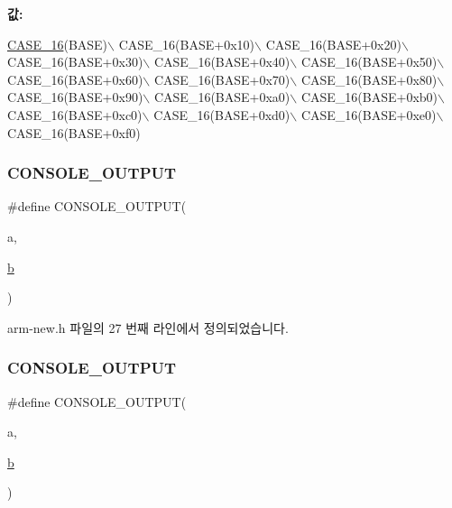 {\bfseries 값\+:}
\begin{DoxyCode}
\mbox{\hyperlink{_g_b_a_8cpp_a7dc7875774844a4717dfa1e8ecbc069c}{CASE\_16}}(BASE)\(\backslash\)
  CASE\_16(BASE+0x10)\(\backslash\)
  CASE\_16(BASE+0x20)\(\backslash\)
  CASE\_16(BASE+0x30)\(\backslash\)
  CASE\_16(BASE+0x40)\(\backslash\)
  CASE\_16(BASE+0x50)\(\backslash\)
  CASE\_16(BASE+0x60)\(\backslash\)
  CASE\_16(BASE+0x70)\(\backslash\)
  CASE\_16(BASE+0x80)\(\backslash\)
  CASE\_16(BASE+0x90)\(\backslash\)
  CASE\_16(BASE+0xa0)\(\backslash\)
  CASE\_16(BASE+0xb0)\(\backslash\)
  CASE\_16(BASE+0xc0)\(\backslash\)
  CASE\_16(BASE+0xd0)\(\backslash\)
  CASE\_16(BASE+0xe0)\(\backslash\)
  CASE\_16(BASE+0xf0)
\end{DoxyCode}
\mbox{\label{arm-new_8h_a8b6846a8c0b8303ae41cedebbeb79965}} 
\subsubsection{\texorpdfstring{C\+O\+N\+S\+O\+L\+E\+\_\+\+O\+U\+T\+P\+UT}{CONSOLE\_OUTPUT}\hspace{0.1cm}{\footnotesize\ttfamily [1/2]}}
{\footnotesize\ttfamily \#define C\+O\+N\+S\+O\+L\+E\+\_\+\+O\+U\+T\+P\+UT(\begin{DoxyParamCaption}\item[{}]{a,  }\item[{}]{\mbox{\hyperlink{expr-lex_8cpp_a91b64995742fd30063314f12340b4b5a}{b}} }\end{DoxyParamCaption})}



arm-\/new.\+h 파일의 27 번째 라인에서 정의되었습니다.

\mbox{\label{_g_b_a_8cpp_a8b6846a8c0b8303ae41cedebbeb79965}} 
\subsubsection{\texorpdfstring{C\+O\+N\+S\+O\+L\+E\+\_\+\+O\+U\+T\+P\+UT}{CONSOLE\_OUTPUT}\hspace{0.1cm}{\footnotesize\ttfamily [2/2]}}
{\footnotesize\ttfamily \#define C\+O\+N\+S\+O\+L\+E\+\_\+\+O\+U\+T\+P\+UT(\begin{DoxyParamCaption}\item[{}]{a,  }\item[{}]{\mbox{\hyperlink{expr-lex_8cpp_a91b64995742fd30063314f12340b4b5a}{b}} }\end{DoxyParamCaption})}


